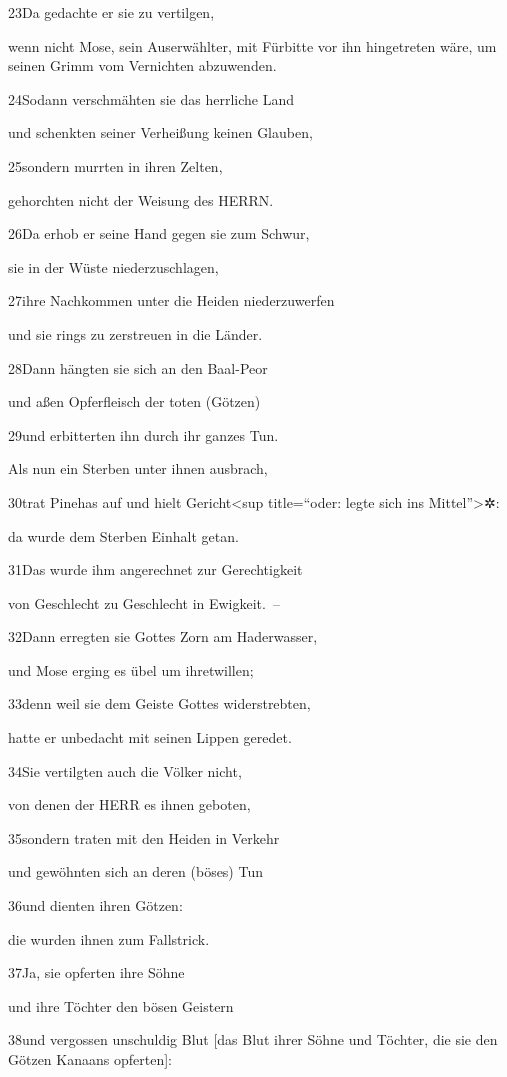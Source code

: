 23Da gedachte er sie zu vertilgen,

wenn nicht Mose, sein Auserwählter, mit Fürbitte vor ihn hingetreten
wäre, um seinen Grimm vom Vernichten abzuwenden.

24Sodann verschmähten sie das herrliche Land

und schenkten seiner Verheißung keinen Glauben,

25sondern murrten in ihren Zelten,

gehorchten nicht der Weisung des HERRN.

26Da erhob er seine Hand gegen sie zum Schwur,

sie in der Wüste niederzuschlagen,

27ihre Nachkommen unter die Heiden niederzuwerfen

und sie rings zu zerstreuen in die Länder.

28Dann hängten sie sich an den Baal-Peor

und aßen Opferfleisch der toten (Götzen)

29und erbitterten ihn durch ihr ganzes Tun.

Als nun ein Sterben unter ihnen ausbrach,

30trat Pinehas auf und hielt Gericht\textless sup title=``oder: legte
sich ins Mittel''\textgreater✲:

da wurde dem Sterben Einhalt getan.

31Das wurde ihm angerechnet zur Gerechtigkeit

von Geschlecht zu Geschlecht in Ewigkeit.~--

32Dann erregten sie Gottes Zorn am Haderwasser,

und Mose erging es übel um ihretwillen;

33denn weil sie dem Geiste Gottes widerstrebten,

hatte er unbedacht mit seinen Lippen geredet.

34Sie vertilgten auch die Völker nicht,

von denen der HERR es ihnen geboten,

35sondern traten mit den Heiden in Verkehr

und gewöhnten sich an deren (böses) Tun

36und dienten ihren Götzen:

die wurden ihnen zum Fallstrick.

37Ja, sie opferten ihre Söhne

und ihre Töchter den bösen Geistern

38und vergossen unschuldig Blut {[}das Blut ihrer Söhne und Töchter, die
sie den Götzen Kanaans opferten{]}:

